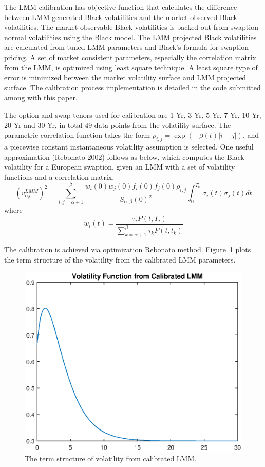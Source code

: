 The LMM calibration has objective function that calculates the difference between LMM generated Black volatilities and the market observed Black volatilities. The market observable Black volatilities is backed out from swaption normal volatilities using the Black model. The LMM projected Black volatilities are calculated from tuned LMM parameters and Black's formula for swaption pricing. A set of market consistent parameters, especially the correlation matrix from the LMM, is optimized using least square technique. A least square type of error is minimized between the market volatility surface and LMM projected surface. The calibration process implementation is detailed in the code submitted among with this paper.

The option and swap tenors used for calibration are 1-Yr, 3-Yr, 5-Yr. 7-Yr, 10-Yr, 20-Yr and 30-Yr, in total 49 data points from the volatility surface. The parametric correlation function takes the form $\rho_{i,j}=\exp(-\beta(t)|i-j|)$, and a piecewise constant instantaneous volatility assumption is selected. One useful approximation (Rebonato 2002) follows as below, which computes the Black volatility for a European swaption, given an LMM with a set of volatility functions and a correlation matrix.
$$
(v_{\alpha_\beta}^{LMM})^2 = \sum_{i,j=\alpha+1}^{\beta} \frac{w_{i}(0)w_{j}(0)f_i(0)f_j(0)\rho_{i,j}}{S_{\alpha,\beta}(0)^2} \int_0^{T_{\alpha}} \sigma_i(t)\sigma_j(t) dt
$$
where
$$
w_i(t) = \frac{\tau_i P(t,T_i)}{\sum_{k=\alpha+1}^{\beta} \tau_k P(t,t_k)}
$$

The calibration is achieved via optimization Rebonato method. Figure~\ref{fig::vol_term} plots the term structure of the volatility from the calibrated LMM parameters.

\begin{center}
  \begin{figure}
    \centering
      \includegraphics[scale=0.5]{vol_func.eps}
      \caption{The term structure of volatility from calibrated LMM.}\label{fig::vol_term}
  \end{figure}
\end{center}

